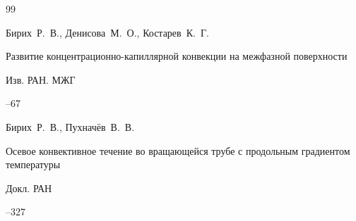 \begin{thebibliography}{99}







\by Бирих~Р.~В., Денисова~М.~О.,  Костарев~К.~Г.

\paper Развитие концентрационно-капиллярной конвекции на межфазной поверхности

\jour Изв. РАН. МЖГ



--67

















\by Бирих~Р.~В., Пухначёв~В.~В.

\paper Осевое конвективное течение во вращающейся трубе с продольным градиентом температуры

\jour Докл. РАН




--327










\end{thebibliography}

